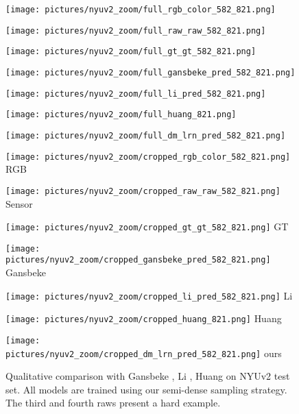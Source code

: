 \documentclass[final]{cvpr}
\begin{document}
\begin{figure*}[!t]
        \begin{multicols}{7}
            \texttt{[image: pictures/nyuv2\_zoom/full\_rgb\_color\_582\_821.png]}\par
            \texttt{[image: pictures/nyuv2\_zoom/full\_raw\_raw\_582\_821.png]}\par
            \texttt{[image: pictures/nyuv2\_zoom/full\_gt\_gt\_582\_821.png]}\par
            \texttt{[image: pictures/nyuv2\_zoom/full\_gansbeke\_pred\_582\_821.png]}\par
            \texttt{[image: pictures/nyuv2\_zoom/full\_li\_pred\_582\_821.png]}\par
            \texttt{[image: pictures/nyuv2\_zoom/full\_huang\_821.png]}\par 
            \texttt{[image: pictures/nyuv2\_zoom/full\_dm\_lrn\_pred\_582\_821.png]}\par 
        \end{multicols}

        \begin{multicols}{7}
            \texttt{[image: pictures/nyuv2\_zoom/cropped\_rgb\_color\_582\_821.png]} \centering \small{RGB}\par
            \texttt{[image: pictures/nyuv2\_zoom/cropped\_raw\_raw\_582\_821.png]} \centering \small{Sensor}\par
            \texttt{[image: pictures/nyuv2\_zoom/cropped\_gt\_gt\_582\_821.png]} \centering \small{GT}\par
            \texttt{[image: pictures/nyuv2\_zoom/cropped\_gansbeke\_pred\_582\_821.png]} \centering \small{Gansbeke \etal \cite{wvangansbeke_depth_2019}}\par
            \texttt{[image: pictures/nyuv2\_zoom/cropped\_li\_pred\_582\_821.png]} \centering \small{Li \etal \cite{msg_chn}}\par
            \texttt{[image: pictures/nyuv2\_zoom/cropped\_huang\_821.png]} \centering \small{Huang \etal \cite{Huang_2019}}\par 
            \texttt{[image: pictures/nyuv2\_zoom/cropped\_dm\_lrn\_pred\_582\_821.png]} \centering \small{ours}\par 
        \end{multicols}


    
    \caption{Qualitative comparison with Gansbeke \etal\cite{wvangansbeke_depth_2019}, Li \etal\cite{msg_chn}, Huang \etal\cite{Huang_2019} on NYUv2 \cite{nyuv2} test set. All models are trained using our semi-dense sampling strategy. The third and fourth raws present a hard example.}
    \label{fig:nyu_viz_test}
    \end{figure*}
    
\end{document}
